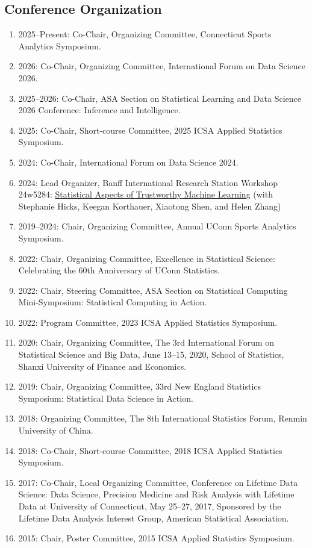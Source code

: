 \documentclass[Statistics]{vita}
\begin{document}
\begin{vita}
  \subsection{Conference Organization}
  \begin{enumerate}
  \item 2025--Present: Co-Chair, Organizing Committee, Connecticut Sports Analytics Symposium.
  \item 2026: Co-Chair, Organizing Committee, International Forum on Data Science 2026. 
  \item 2025--2026: Co-Chair, ASA Section on Statistical Learning and Data Science 2026 Conference: Inference and Intelligence.
  \item 2025: Co-Chair, Short-course Committee, 2025 ICSA Applied Statistics Symposium.
  \item 2024: Co-Chair, International Forum on Data Science 2024.
  \item 2024: Lead Organizer, Banff International Research Station Workshop 24w5284: \href{http://www.birs.ca/event/24w5284}{Statistical Aspects of Trustworthy Machine Learning} (with Stephanie Hicks, Keegan Korthauer, Xiaotong Shen, and Helen Zhang)
  \item 2019--2024: Chair, Organizing Committee, Annual UConn Sports Analytics Symposium.
  \item 2022: Chair, Organizing Committee, Excellence in Statistical Science: Celebrating the 60th Anniversary of UConn Statistics.
  \item 2022: Chair, Steering Committee, ASA Section on Statistical Computing Mini-Symposium: Statistical Computing in Action.
  \item 2022: Program Committee, 2023 ICSA Applied Statistics Symposium.
  \item 2020: Chair, Organizing Committee, The 3rd International Forum on Statistical Science and Big Data, June 13--15, 2020, School of Statistics, Shanxi University of Finance and Economics.
  \item 2019: Chair, Organizing Committee, 33rd New England Statistics Symposium: Statistical Data Science in Action.
  \item 2018: Organizing Committee, The 8th International Statistics Forum, Renmin University of China.
  \item 2018: Co-Chair, Short-course Committee, 2018 ICSA Applied Statistics Symposium.
  \item 2017: Co-Chair, Local Organizing Committee,  Conference on Lifetime Data Science: Data Science, Precision Medicine and Risk Analysis with Lifetime Data at University of Connecticut, May 25--27, 2017, Sponsored by the Lifetime Data Analysis Interest Group, American Statistical Association.
  \item 2015: Chair, Poster Committee, 2015 ICSA Applied Statistics Symposium.
  \end{enumerate}

\end{vita}
\end{document}
